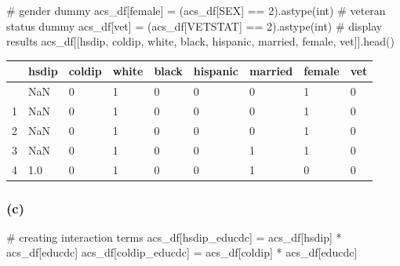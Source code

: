 \documentclass[
  letterpaper,
  DIV=11,
  numbers=noendperiod]{scrartcl}
\newenvironment{Shaded}{\begin{snugshade}}{\end{snugshade}}
\newcommand{\BuiltInTok}[1]{\textcolor[rgb]{0.00,0.23,0.31}{#1}}
\newcommand{\CommentTok}[1]{\textcolor[rgb]{0.37,0.37,0.37}{#1}}
\newcommand{\DecValTok}[1]{\textcolor[rgb]{0.68,0.00,0.00}{#1}}
\newcommand{\NormalTok}[1]{\textcolor[rgb]{0.00,0.23,0.31}{#1}}
\newcommand{\OperatorTok}[1]{\textcolor[rgb]{0.37,0.37,0.37}{#1}}
\newcommand{\StringTok}[1]{\textcolor[rgb]{0.13,0.47,0.30}{#1}}
\begin{document}
\begin{Shaded}
\begin{Highlighting}[]
\CommentTok{\# gender dummy}
\NormalTok{acs\_df[}\StringTok{\textquotesingle{}female\textquotesingle{}}\NormalTok{] }\OperatorTok{=}\NormalTok{ (acs\_df[}\StringTok{\textquotesingle{}SEX\textquotesingle{}}\NormalTok{] }\OperatorTok{==} \DecValTok{2}\NormalTok{).astype(}\BuiltInTok{int}\NormalTok{)}
\CommentTok{\# veteran status dummy}
\NormalTok{acs\_df[}\StringTok{\textquotesingle{}vet\textquotesingle{}}\NormalTok{] }\OperatorTok{=}\NormalTok{ (acs\_df[}\StringTok{\textquotesingle{}VETSTAT\textquotesingle{}}\NormalTok{] }\OperatorTok{==} \DecValTok{2}\NormalTok{).astype(}\BuiltInTok{int}\NormalTok{)}
\CommentTok{\# display results}
\NormalTok{acs\_df[[}\StringTok{\textquotesingle{}hsdip\textquotesingle{}}\NormalTok{, }\StringTok{\textquotesingle{}coldip\textquotesingle{}}\NormalTok{, }\StringTok{\textquotesingle{}white\textquotesingle{}}\NormalTok{, }\StringTok{\textquotesingle{}black\textquotesingle{}}\NormalTok{,}
        \StringTok{\textquotesingle{}hispanic\textquotesingle{}}\NormalTok{, }\StringTok{\textquotesingle{}married\textquotesingle{}}\NormalTok{, }\StringTok{\textquotesingle{}female\textquotesingle{}}\NormalTok{, }\StringTok{\textquotesingle{}vet\textquotesingle{}}\NormalTok{]].head()}
\end{Highlighting}
\end{Shaded}

\begin{longtable}[]{@{}lllllllll@{}}
\toprule\noalign{}
& hsdip & coldip & white & black & hispanic & married & female & vet \\
\midrule\noalign{}
\endhead
\bottomrule\noalign{}
\endlastfoot
0 & NaN & 0 & 1 & 0 & 0 & 0 & 1 & 0 \\
1 & NaN & 0 & 1 & 0 & 0 & 0 & 1 & 0 \\
2 & NaN & 0 & 1 & 0 & 0 & 0 & 1 & 0 \\
3 & NaN & 0 & 1 & 0 & 0 & 1 & 1 & 0 \\
4 & 1.0 & 0 & 1 & 0 & 0 & 1 & 0 & 0 \\
\end{longtable}

\subsubsection{(c)}\label{c}

\begin{Shaded}
\begin{Highlighting}[]
\CommentTok{\# creating interaction terms}
\NormalTok{acs\_df[}\StringTok{\textquotesingle{}hsdip\_educdc\textquotesingle{}}\NormalTok{] }\OperatorTok{=}\NormalTok{ acs\_df[}\StringTok{\textquotesingle{}hsdip\textquotesingle{}}\NormalTok{] }\OperatorTok{*}\NormalTok{ acs\_df[}\StringTok{\textquotesingle{}educdc\textquotesingle{}}\NormalTok{]}
\NormalTok{acs\_df[}\StringTok{\textquotesingle{}coldip\_educdc\textquotesingle{}}\NormalTok{] }\OperatorTok{=}\NormalTok{ acs\_df[}\StringTok{\textquotesingle{}coldip\textquotesingle{}}\NormalTok{] }\OperatorTok{*}\NormalTok{ acs\_df[}\StringTok{\textquotesingle{}educdc\textquotesingle{}}\NormalTok{]}
\end{Highlighting}
\end{Shaded}
\end{document}
